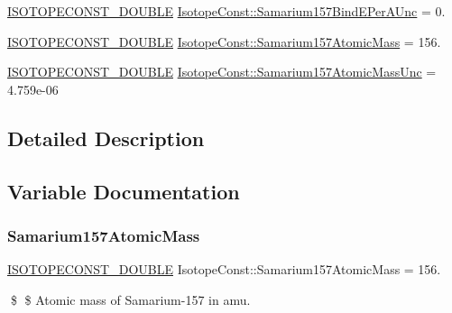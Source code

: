 \begin{DoxyCompactItemize}
\mbox{\hyperlink{group___isotope_const-_macros_ga8f45a7272ce02c0b4c65c44636ed719a}{I\+S\+O\+T\+O\+P\+E\+C\+O\+N\+S\+T\+\_\+\+D\+O\+U\+B\+LE}} \mbox{\hyperlink{group___isotope_const-_samarium-_sm157_ga2c7eb089661af872eeb7f6bf1487fa6f}{Isotope\+Const\+::\+Samarium157\+Bind\+E\+Per\+A\+Unc}} = 0.
\item 
\mbox{\hyperlink{group___isotope_const-_macros_ga8f45a7272ce02c0b4c65c44636ed719a}{I\+S\+O\+T\+O\+P\+E\+C\+O\+N\+S\+T\+\_\+\+D\+O\+U\+B\+LE}} \mbox{\hyperlink{group___isotope_const-_samarium-_sm157_ga1c2d4eed7cf45280f71603a53eabcc76}{Isotope\+Const\+::\+Samarium157\+Atomic\+Mass}} = 156.
\item 
\mbox{\hyperlink{group___isotope_const-_macros_ga8f45a7272ce02c0b4c65c44636ed719a}{I\+S\+O\+T\+O\+P\+E\+C\+O\+N\+S\+T\+\_\+\+D\+O\+U\+B\+LE}} \mbox{\hyperlink{group___isotope_const-_samarium-_sm157_ga902a5bf304f0dc95cdef161b9efc35d5}{Isotope\+Const\+::\+Samarium157\+Atomic\+Mass\+Unc}} = 4.\+759e-\/06
\end{DoxyCompactItemize}


\subsection{Detailed Description}


\subsection{Variable Documentation}
\mbox{\label{group___isotope_const-_samarium-_sm157_ga1c2d4eed7cf45280f71603a53eabcc76}} 
\subsubsection{\texorpdfstring{Samarium157\+Atomic\+Mass}{Samarium157AtomicMass}}
{\footnotesize\ttfamily \mbox{\hyperlink{group___isotope_const-_macros_ga8f45a7272ce02c0b4c65c44636ed719a}{I\+S\+O\+T\+O\+P\+E\+C\+O\+N\+S\+T\+\_\+\+D\+O\+U\+B\+LE}} Isotope\+Const\+::\+Samarium157\+Atomic\+Mass = 156.}

\$ \$ Atomic mass of Samarium-\/157 in amu. \mbox{\label{group___isotope_const-_samarium-_sm157_ga902a5bf304f0dc95cdef161b9efc35d5}} 
